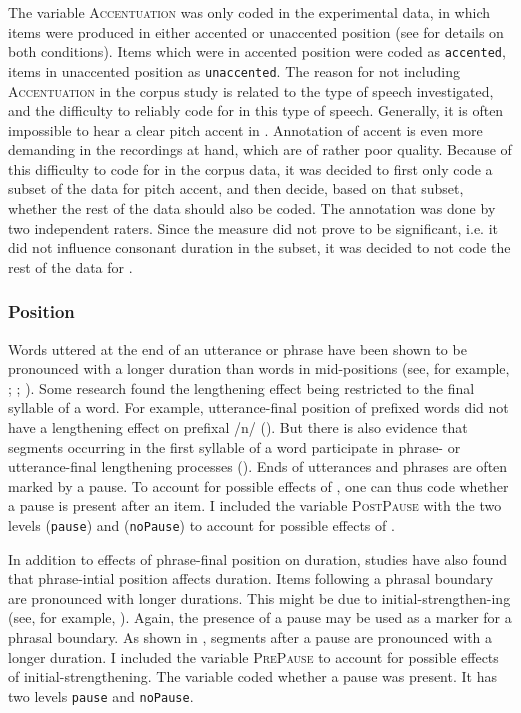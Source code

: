 The variable \textsc{Accentuation} was only coded in the experimental data, in which items were produced in either accented or unaccented position (see  for details on both conditions). Items which were in accented position were coded as \texttt{accented}, items in unaccented position as \texttt{unaccented}. 
The reason for not including \textsc{Accentuation} in the corpus study is related to the type of speech investigated, and the difficulty to reliably code for  in this type of speech. Generally, it is often impossible to hear a clear pitch accent in . 
Annotation of accent is even more demanding in the recordings at hand, which are of rather poor quality. Because of this difficulty to code for  in the corpus data, it was decided to first only code a subset of the data for pitch accent, and then decide, based on that subset, whether the rest of the data should also be coded. The annotation was done by two independent raters. Since the measure did not prove to be significant, i.e. it did not influence consonant duration in the subset, it was decided to not code the rest of the data for .


\subsubsection{Position} 
Words uttered at the end of an utterance or phrase have been shown to be pronounced with a longer duration than words in mid-positions (see, for example,  \citealt{Berkovits.1993}; \citealt{Hay.2007}; \citealt{Oller.1973}). Some research found the lengthening effect being restricted to the final syllable of a word. For example, utterance-final position of prefixed words did not have a lengthening effect on prefixal /n/ (\citealt{Hay.2007}). But there is also evidence that segments occurring in the first syllable of a word participate in phrase- or utterance-final lengthening processes (\citealt{Oller.1973}). Ends of utterances and phrases are often marked by a pause. To account for possible effects of , one can thus code whether a pause is present after an item. I included the variable \textsc{PostPause} with the two levels (\texttt{pause}) and (\texttt{noPause}) to account for possible effects of . 

In addition to effects of phrase-final position on duration, studies have also found that phrase-intial position affects duration. Items following a phrasal boundary are pronounced with longer durations. This might be due to initial-strengthen-ing (see, for example, \citealt{Cho.2001b,Byrd.2006,Cho.2007}). Again, the presence of a pause may be used as a marker for a phrasal boundary. As shown in \cite{Umeda.1977}, segments after a pause are pronounced with a longer duration. 
I included the variable \textsc{PrePause} to account for possible effects of initial-strengthening. The variable coded whether a pause was present. It has two levels \texttt{pause} and \texttt{noPause}. 

